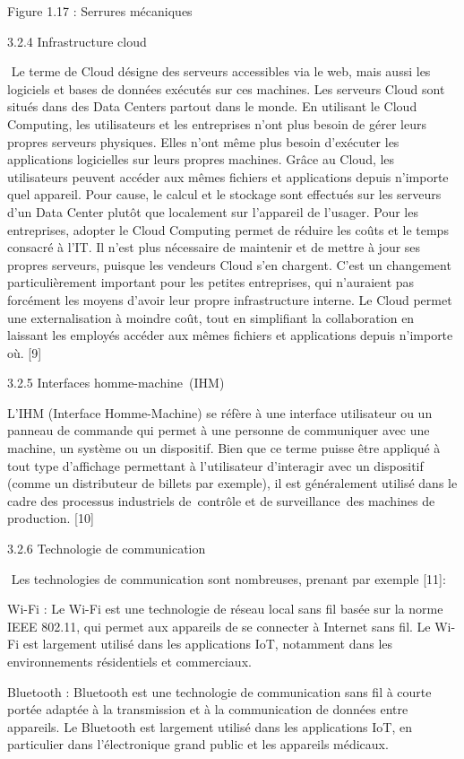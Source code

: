 \documentclass{article}
\begin{document}
Figure 1.17 : Serrures mécaniques

3.2.4 Infrastructure cloud

​ Le terme de Cloud  désigne des serveurs accessibles via le web, mais aussi les logiciels et bases de données exécutés sur ces machines. Les serveurs Cloud sont situés dans des Data Centers partout dans le monde. En utilisant le Cloud Computing, les utilisateurs et les entreprises n’ont plus besoin de gérer leurs propres serveurs physiques. Elles n’ont même plus besoin d’exécuter les applications logicielles sur leurs propres machines. Grâce au Cloud, les utilisateurs peuvent accéder aux mêmes fichiers et applications depuis n’importe quel appareil. Pour cause, le calcul et le stockage sont effectués sur les serveurs d’un Data Center plutôt que localement sur l’appareil de l’usager. Pour les entreprises, adopter le Cloud Computing permet de réduire les coûts et le temps consacré à l’IT. Il n’est plus nécessaire de maintenir et de mettre à jour ses propres serveurs, puisque les vendeurs Cloud s’en chargent. C’est un changement particulièrement important pour les petites entreprises, qui n’auraient pas forcément les moyens d’avoir leur propre infrastructure interne. Le Cloud permet une externalisation à moindre coût, tout en simplifiant la collaboration en laissant les employés accéder aux mêmes fichiers et applications depuis n’importe où. [9]

3.2.5 Interfaces homme-machine (IHM)

L'IHM (Interface Homme-Machine) se réfère à une interface utilisateur ou un panneau de commande qui permet à une personne de communiquer avec une machine, un système ou un dispositif. Bien que ce terme puisse être appliqué à tout type d'affichage permettant à l'utilisateur d'interagir avec un dispositif (comme un distributeur de billets par exemple), il est généralement utilisé dans le cadre des processus industriels de contrôle et de surveillance des machines de production. [10]

3.2.6  Technologie de communication

​ Les technologies de communication sont nombreuses, prenant par exemple [11]:

Wi-Fi : Le Wi-Fi est une technologie de réseau local sans fil basée sur la norme IEEE 802.11, qui permet aux appareils de se connecter à Internet sans fil. Le Wi-Fi est largement utilisé dans les applications IoT, notamment dans les environnements résidentiels et commerciaux.

Bluetooth : Bluetooth est une technologie de communication sans fil à courte portée adaptée à la transmission et à la communication de données entre appareils. Le Bluetooth est largement utilisé dans les applications IoT, en particulier dans l'électronique grand public et les appareils médicaux.
\end{document}
